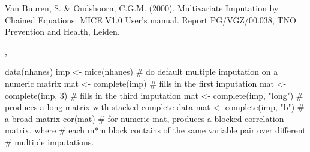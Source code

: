 \documentclass{article}
\begin{document}
\begin{References}\relax
Van Buuren, S. \& Oudshoorn, C.G.M. (2000). Multivariate Imputation by Chained Equations: 
MICE V1.0 User's manual. Report PG/VGZ/00.038, TNO Prevention and Health, Leiden.
\end{References}
\begin{SeeAlso}\relax
{}, 
\end{SeeAlso}
\begin{Examples}
\begin{ExampleCode}
data(nhanes)
imp <- mice(nhanes)     # do default multiple imputation on a numeric matrix
mat <- complete(imp)    # fills in the first imputation
mat <- complete(imp, 3) # fills in the third imputation
mat <- complete(imp, "long") # produces a long matrix with stacked complete data
mat <- complete(imp, "b") # a broad matrix
cor(mat)                # for numeric mat, produces a blocked correlation matrix, where
            # each m*m block contains of the same variable pair over different
            # multiple imputations.
\end{ExampleCode}
\end{Examples}
\end{document}
